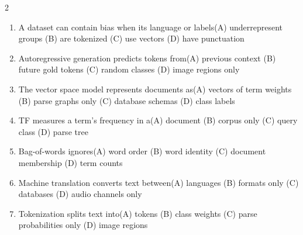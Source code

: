 \documentclass[a4paper]{article}
\begin{document}
\begin{multicols*}{2}
\begin{enumerate}[resume]
\item A dataset can contain bias when its language or labels\newline\hspace*{0.6em}(A) underrepresent groups \quad (B) are tokenized \newline\hspace*{0.6em}(C) use vectors \quad (D) have punctuation
\item Autoregressive generation predicts tokens from\newline\hspace*{0.6em}(A) previous context \quad (B) future gold tokens \newline\hspace*{0.6em}(C) random classes \quad (D) image regions only
\item The vector space model represents documents as\newline\hspace*{0.6em}(A) vectors of term weights \quad (B) parse graphs only \newline\hspace*{0.6em}(C) database schemas \quad (D) class labels
\item TF measures a term's frequency in a\newline\hspace*{0.6em}(A) document \quad (B) corpus only \newline\hspace*{0.6em}(C) query class \quad (D) parse tree
\item Bag-of-words ignores\newline\hspace*{0.6em}(A) word order \quad (B) word identity \newline\hspace*{0.6em}(C) document membership \quad (D) term counts
\item Machine translation converts text between\newline\hspace*{0.6em}(A) languages \quad (B) formats only \newline\hspace*{0.6em}(C) databases \quad (D) audio channels only
\item Tokenization splits text into\newline\hspace*{0.6em}(A) tokens \quad (B) class weights \newline\hspace*{0.6em}(C) parse probabilities only \quad (D) image regions

\end{enumerate}
\end{multicols*}
\end{document}
